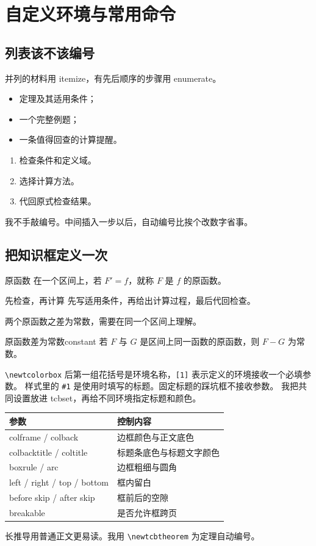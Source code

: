 \documentclass[UTF8,11pt,a4paper,oneside,openany,linespread=1]{ctexbook}
\begin{document}
\setcounter{chapter}{3}
\chapter{自定义环境与常用命令}

\section{列表该不该编号}
并列的材料用 itemize，有先后顺序的步骤用 enumerate。
\begin{itemize}
  \item 定理及其适用条件；
  \item 一个完整例题；
  \item 一条值得回查的计算提醒。
\end{itemize}
\begin{enumerate}[label=\arabic*.,leftmargin=*]
  \item 检查条件和定义域。
  \item 选择计算方法。
  \item 代回原式检查结果。
\end{enumerate}
我不手敲编号。中间插入一步以后，自动编号比挨个改数字省事。

\section{把知识框定义一次}
\begin{conceptbox}{原函数}
在一个区间上，若 \(F'=f\)，就称 \(F\) 是 \(f\) 的原函数。
\end{conceptbox}
\begin{methodbox}{先检查，再计算}
先写适用条件，再给出计算过程，最后代回检查。
\end{methodbox}
\begin{pitfallbox}
两个原函数之差为常数，需要在同一个区间上理解。
\end{pitfallbox}
\begin{notetheorem}{原函数差为常数}{constant}
若 \(F\) 与 \(G\) 是区间上同一函数的原函数，则 \(F-G\) 为常数。
\end{notetheorem}

\verb|\newtcolorbox| 后第一组花括号是环境名称，\verb|[1]| 表示定义的环境接收一个必填参数。
样式里的 \verb|#1| 是使用时填写的标题。固定标题的踩坑框不接收参数。
我把共同设置放进 tcbset，再给不同环境指定标题和颜色。
\begin{center}
\begin{tabular}{ll}
\toprule
参数 & 控制内容 \\
\midrule
colframe / colback & 边框颜色与正文底色 \\
colbacktitle / coltitle & 标题条底色与标题文字颜色 \\
boxrule / arc & 边框粗细与圆角 \\
left / right / top / bottom & 框内留白 \\
before skip / after skip & 框前后的空隙 \\
breakable & 是否允许框跨页 \\
\bottomrule
\end{tabular}
\end{center}
长推导用普通正文更易读。我用 \verb|\newtcbtheorem| 为定理自动编号。
\end{document}
